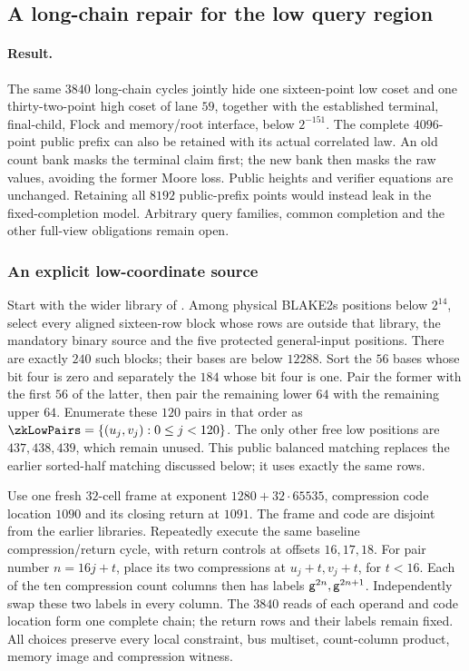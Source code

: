 \subsection{A long-chain repair for the low query region}\label{note:zk-flock-lowbank}

\paragraph{Result.} The same $3840$ long-chain cycles jointly hide one sixteen-point low coset and one thirty-two-point high coset of lane $59$, together with the established terminal, final-child, Flock and memory/root interface, below $2^{-151}$. The complete $4096$-point public prefix can also be retained with its actual correlated law. An old count bank masks the terminal claim first; the new bank then masks the raw values, avoiding the former Moore loss. Public heights and verifier equations are unchanged. Retaining all $8192$ public-prefix points would instead leak in the fixed-completion model. Arbitrary query families, common completion and the other full-view obligations remain open.

\subsubsection{An explicit low-coordinate source}

Start with the wider library of . Among physical BLAKE2s positions below $2^{14}$, select every aligned sixteen-row block whose rows are outside that library, the mandatory binary source and the five protected general-input positions. There are exactly $240$ such blocks; their bases are below $12288$. Sort the $56$ bases whose bit four is zero and separately the $184$ whose bit four is one. Pair the former with the first $56$ of the latter, then pair the remaining lower $64$ with the remaining upper $64$. Enumerate these $120$ pairs in that order as $\zkLowPairs=\{(u_j,v_j):0\le j<120\}$. The only other free low positions are $437,438,439$, which remain unused. This public balanced matching replaces the earlier sorted-half matching discussed below; it uses exactly the same rows.

Use one fresh $32$-cell frame at exponent $1280+32\cdot65535$, compression code location $1090$ and its closing return at $1091$. The frame and code are disjoint from the earlier libraries. Repeatedly execute the same baseline compression/return cycle, with return controls at offsets $16,17,18$. For pair number $n=16j+t$, place its two compressions at $u_j+t,v_j+t$, for $t<16$. Each of the ten compression count columns then has labels $\mathsf{g}^{2n},\mathsf{g}^{2n+1}$. Independently swap these two labels in every column. The $3840$ reads of each operand and code location form one complete chain; the return rows and their labels remain fixed. All choices preserve every local constraint, bus multiset, count-column product, memory image and compression witness.

